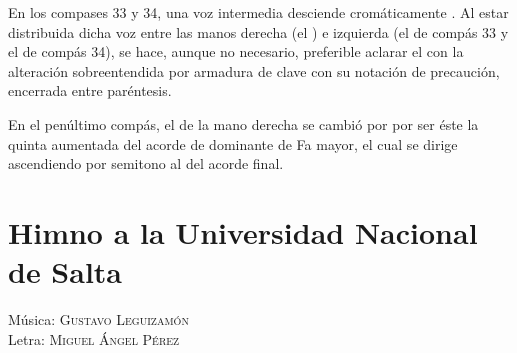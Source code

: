 En los compases 33 y 34, una voz intermedia desciende cromáticamente . Al estar distribuida dicha voz entre las manos derecha (el ) e izquierda (el  de compás 33 y el  de compás 34), se hace, aunque no necesario, preferible aclarar el  con la alteración sobreentendida por armadura de clave con su notación de precaución, encerrada entre paréntesis.

En el penúltimo compás, el  de la mano derecha se cambió por  por ser éste la quinta aumentada del acorde de dominante de Fa mayor, el cual se dirige ascendiendo por semitono al  del acorde final.


\newpage
\section{Himno a la Universidad Nacional de Salta}\label{partitura-digitalizada}

\begin{flushright}
Música: \textsc{Gustavo Leguizamón}\\
Letra: \textsc{Miguel Ángel Pérez}
\end{flushright}

